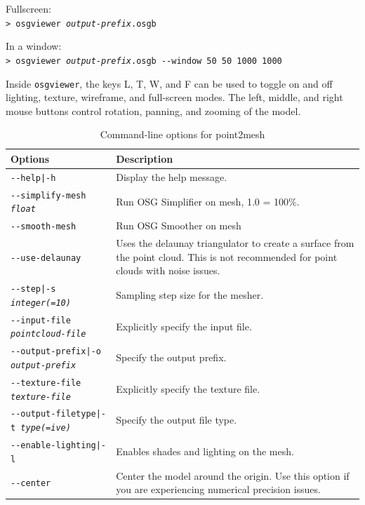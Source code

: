 \hspace*{2em}Fullscreen:\\
\hspace*{2em}\texttt{> osgviewer \textit{output-prefix}.osgb}

\hspace*{2em}In a window:\\
\hspace*{2em}\texttt{> osgviewer \textit{output-prefix}.osgb -\/-window 50 50 1000 1000}

Inside \texttt{osgviewer}, the keys L, T, W, and F can be used to toggle on
and off lighting, texture, wireframe, and full-screen modes.  The left, middle, and
right mouse buttons control rotation, panning, and zooming of the
model.

\begin{longtable}{|l|p{10cm}|}
\caption{Command-line options for point2mesh}
\label{tbl:point2mesh}
\endfirsthead
\endhead
\endfoot
\endlastfoot
\hline
Options & Description \\ \hline \hline
\texttt{-\/-help|-h} & Display the help message.\\ \hline
\texttt{-\/-simplify-mesh \textit{float}} & Run OSG Simplifier on mesh, 1.0 = 100\%. \\ \hline
\texttt{-\/-smooth-mesh} & Run OSG Smoother on mesh \\ \hline
\texttt{-\/-use-delaunay} & Uses the delaunay triangulator to create a surface from the point cloud. This is not recommended for point clouds with noise issues. \\ \hline
\texttt{-\/-step|-s \textit{integer(=10)}} & Sampling step size for the mesher. \\ \hline
\texttt{-\/-input-file \textit{pointcloud-file}} & Explicitly specify the input file. \\ \hline
\texttt{-\/-output-prefix|-o \textit{output-prefix}} & Specify the output prefix. \\ \hline
\texttt{-\/-texture-file \textit{texture-file}} & Explicitly specify the texture file. \\ \hline
\texttt{-\/-output-filetype|-t \textit{type(=ive)}} & Specify the output file type. \\ \hline
\texttt{-\/-enable-lighting|-l} & Enables shades and lighting on the mesh. \\ \hline
\texttt{-\/-center} & Center the model around the origin. Use this option if you are experiencing numerical precision issues. \\ \hline
\end{longtable}

